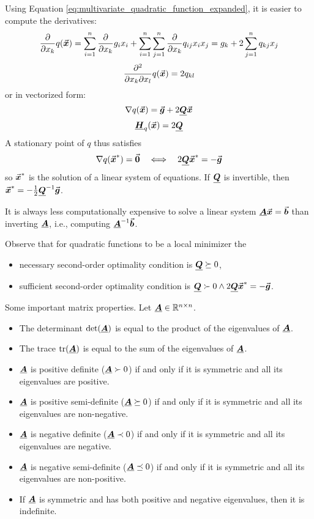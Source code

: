 Using Equation \eqref{eq:multivariate_quadratic_function_expanded}, it is easier to compute the derivatives:
\[
\frac{\partial}{\partial x_{k}}q(\vect{x}) = \sum_{i=1}^{n}\frac{\partial}{\partial x_{k}}g_{i}x_{i} + \sum_{i=1}^{n}\sum_{j=1}^{n}\frac{\partial}{\partial x_{k}}q_{ij}x_{i}x_{j} = g_{k} + 2\sum_{j=1}^{n}q_{kj}x_{j} %
\]
\[
\frac{\partial^{2}}{\partial x_{k}\partial x_{l}}q(\vect{x}) = 2q_{kl} %
\]
or in vectorized form:
\[
\nabla q(\vect{x}) = \vect{g} + 2\matr{Q}\vect{x} %
\]
\[
\matr{H}_{q}(\vect{x}) = 2\matr{Q} %
\]
A stationary point of \(q\) thus satisfies
\[
\nabla q(\vec{\boldsymbol{x}}^{*}) = \vec{\boldsymbol{0}} \quad \Longleftrightarrow  \quad 2\underline{\boldsymbol{Q}}\vec{\boldsymbol{x}}^{*} = -\vec{\boldsymbol{g}}
\]
so \(\vec{\boldsymbol{x}}^{*}\) is the solution of a linear system of equations. If \(\underline{\boldsymbol{Q}}\) is invertible, then 
\(\vec{\boldsymbol{x}}^{*} = -\frac{1}{2}\underline{\boldsymbol{Q}}^{-1}\vec{\boldsymbol{g}}\).

\begin{remark}
It is always less computationally expensive to solve a linear system \(\underline{\boldsymbol{A}}\vec{\boldsymbol{x}} = \vec{\boldsymbol{b}}\) than inverting \(\underline{\boldsymbol{A}}\), i.e., computing \(\underline{\boldsymbol{A}}^{-1}\vec{\boldsymbol{b}}\).
\end{remark}

Observe that for quadratic functions to be a local minimizer the
\begin{itemize}
\item necessary second-order optimality condition is \(\underline{\boldsymbol{Q}} \succeq 0\),
\item sufficient second-order optimality condition is \(\underline{\boldsymbol{Q}} \succ 0 \wedge 2\underline{\boldsymbol{Q}}\vec{\boldsymbol{x}}^{*} = -\vec{\boldsymbol{g}}\).
\end{itemize}

\begin{caution}
Some important matrix properties. Let \(\underline{\boldsymbol{A}} \in \mathbb{R}^{n \times n}\).
\begin{itemize}
\item The determinant \(\det(\underline{\boldsymbol{A}})\) is equal to the product of the eigenvalues of \(\underline{\boldsymbol{A}}\).
\item The trace \(\mathrm{tr}(\underline{\boldsymbol{A}})\) is equal to the sum of the eigenvalues of \(\underline{\boldsymbol{A}}\).
\item \(\underline{\boldsymbol{A}}\) is positive definite (\(\underline{\boldsymbol{A}} \succ 0\)) if and only if it is symmetric and all its eigenvalues are positive.
\item \(\underline{\boldsymbol{A}}\) is positive semi-definite (\(\underline{\boldsymbol{A}} \succeq 0\)) if and only if it is symmetric and all its eigenvalues are non-negative.
\item \(\underline{\boldsymbol{A}}\) is negative definite (\(\underline{\boldsymbol{A}} \prec 0\)) if and only if it is symmetric and all its eigenvalues are negative.
\item \(\underline{\boldsymbol{A}}\) is negative semi-definite (\(\underline{\boldsymbol{A}} \preceq 0\)) if and only if it is symmetric and all its eigenvalues are non-positive.
\item If \(\underline{\boldsymbol{A}}\) is symmetric and has both positive and negative eigenvalues, then it is indefinite.
\end{itemize}
\end{caution}

